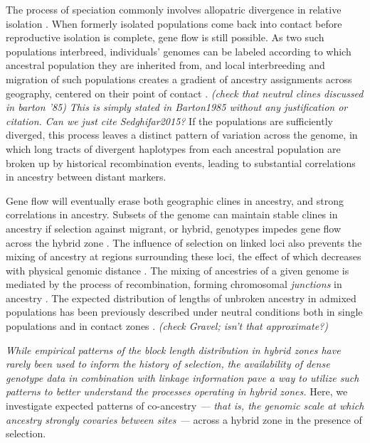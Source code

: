 \documentclass[11pt,letterpaper]{article}
\newcommand{\alisa}[1]{{\em \color{red} #1}}
\newcommand{\plr}[1]{{\em \color{blue} #1}}
\newcommand{\yb}[1]{{\em \color{magenta} #1}}
\begin{document}
The process of speciation commonly involves allopatric divergence in relative isolation \citep{Coyne2004}.  
When formerly isolated populations come back into contact 
before reproductive isolation is complete, gene flow is still possible. 
As two such populations interbreed,
individuals' genomes can be labeled according to which ancestral population they are inherited from,
and local interbreeding and migration of such populations
creates a gradient of ancestry assignments across geography,
centered on their point of contact \citep{Barton1985}. 
\plr{(check that neutral clines discussed in barton '85)}\alisa{This is simply stated in Barton1985 without any justification or citation. Can we just cite Sedghifar2015?}
If the populations are sufficiently diverged,
this process leaves a distinct pattern of variation across the genome, 
in which long tracts of divergent haplotypes from each ancestral population  
are broken up by historical recombination events,
leading to substantial correlations in ancestry between distant markers.


Gene flow will eventually erase 
both geographic clines in ancestry, and strong correlations in ancestry.
Subsets of the genome can maintain stable clines in ancestry if selection against migrant, or hybrid, genotypes impedes gene flow across the hybrid zone \citep{Barton1979a}. The influence of selection on linked loci also prevents the mixing of ancestry at regions surrounding these loci, the effect of which decreases with physical genomic distance \citep{Barton1986,Barton1983}. 
The mixing of ancestries of a given genome is mediated by 
the process of recombination, forming chromosomal \emph{junctions} in ancestry \citep{Fisher1954, Chapman2002, Baird2003}.   
The expected distribution of lengths of unbroken ancestry in admixed populations has been previously described under neutral conditions both in single populations and in contact zones \citep[e.g.][]{Gravel2012,Sedghifar2015}.  
\plr{(check Gravel; isn't that approximate?)}

\yb{While empirical patterns of the block length distribution in hybrid zones have rarely been used to inform the history of selection,}  \alisa{the availability of dense genotype data in combination with linkage information pave a way to utilize such patterns to better understand the processes operating in hybrid zones. } %
Here, we investigate expected patterns of co-ancestry \yb{ --- that is, the genomic scale at which ancestry strongly covaries between sites --- } across a hybrid zone in the presence of selection. 
\end{document}
